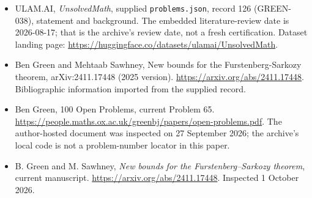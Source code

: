 \documentclass[11pt,a4paper]{article}
\begin{document}
{\small

\begin{itemize}

\item[\hypertarget{source:126:1}{S1}] ULAM.AI, \emph{UnsolvedMath}, supplied \texttt{problems.json}, record 126 (GREEN-038), statement and background. The embedded literature-review date is 2026-08-17; that is the archive’s review date, not a fresh certification. Dataset landing page: \url{https://huggingface.co/datasets/ulamai/UnsolvedMath}.

\item[\hypertarget{source:126:2}{S2}] Ben Green and Mehtaab Sawhney, New bounds for the Furstenberg-Sarkozy theorem, arXiv:2411.17448 (2025 version). \url{https://arxiv.org/abs/2411.17448}. Bibliographic information imported from the supplied record.

\item[\hypertarget{source:126:3}{S3}] Ben Green, 100 Open Problems, current Problem 65. \url{https://people.maths.ox.ac.uk/greenbj/papers/open-problems.pdf}. The author-hosted document was inspected on 27 September 2026; the archive’s local code is not a problem-number locator in this paper.

\item[E1] B. Green and M. Sawhney, \emph{New bounds for the Furstenberg--Sarkozy theorem}, current manuscript. \url{https://arxiv.org/abs/2411.17448}. Inspected 1 October 2026.

\end{itemize}

}

\label{end:126}
\end{document}
